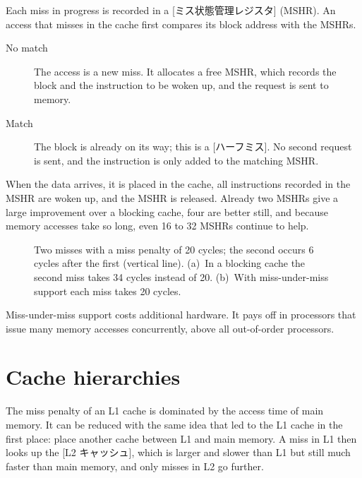 \documentclass[../main.tex]{subfiles}
\begin{document}
Each miss in progress is recorded in a
[ミス状態管理レジスタ]%
 (MSHR).  An access that
misses in the cache first compares its block address with the MSHRs.
\begin{description}
  \item[No match] The access is a new miss.  It allocates a free MSHR, which
    records the block and the instruction to be woken up, and the request is
    sent to memory.
  \item[Match] The block is already on its way; this is a
    [ハーフミス].  No second request is sent, and the
    instruction is only added to the matching MSHR.
\end{description}
When the data arrives, it is placed in the cache, all instructions recorded in
the MSHR are woken up, and the MSHR is released.  Already two MSHRs give a
large improvement over a blocking cache, four are better still, and because
memory accesses take so long, even 16 to 32 MSHRs continue to
help.

\begin{figure}[htbp]
  \centering
  
  \caption{Two misses with a miss penalty of 20 cycles; the second occurs 6
    cycles after the first (vertical line).  (a)~In a blocking cache the
    second miss takes 34 cycles instead of 20.  (b)~With miss-under-miss
    support each miss takes 20 cycles.}
  \label{fig:l14-overlap}
\end{figure}

Miss-under-miss support costs additional hardware.  It pays off in
processors that issue many memory accesses concurrently, above all
out-of-order processors.

\section{Cache hierarchies}
\label{sec:l14-hierarchy}

The miss penalty of an L1 cache is dominated by the access time of main
memory.  It can be reduced with
the same idea that led to the L1 cache in the first place: place another
cache between L1 and main memory.  A miss in L1 then looks up the
[L2 キャッシュ], which is larger and slower than L1 but still
much faster than main memory, and only misses in L2 go further.
\end{document}
